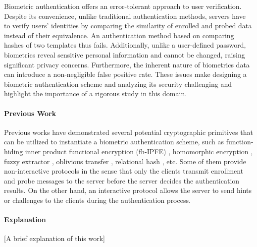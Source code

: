 


Biometric authentication offers an error-tolerant approach to user verification. Despite its convenience, unlike traditional authentication methods, servers have to verify users' identities by comparing the similarity of enrolled and probed data instead of their equivalence. An authentication method based on comparing hashes of two templates thus fails. Additionally, unlike a user-defined password, biometrics reveal sensitive personal information and cannot be changed, raising significant privacy concerns. Furthermore, the inherent nature of biometrics data can introduce a non-negligible false positive rate. These issues make designing a biometric authentication scheme and analyzing its security challenging and highlight the importance of a rigorous study in this domain.

\paragraph{Previous Work}
Previous works have demonstrated several potential cryptographic primitives that can be utilized to instantiate a biometric authentication scheme, such as function-hiding inner product functional encryption (fh-IPFE) \cite{cryptoeprint:2016/440, cryptoeprint:2018/1214, 10.1007/978-3-030-90567-5_33, 10.1145/3488932.3497754, cryptoeprint:2023/481}, homomorphic encryption \cite{10.1007/978-3-642-40588-4_5, pradel2021privacypreservingbiometricmatchingusing}, fuzzy extractor \cite{10.1145/1030083.1030096, 7980010}, oblivious transfer \cite{cryptoeprint:2012/586}, relational hash \cite{cryptoeprint:2014/394}, etc. Some of them provide non-interactive protocols in the sense that only the clients transmit enrollment and probe messages to the server before the server decides the authentication results. On the other hand, an interactive protocol allows the server to send hints or challenges to the clients during the authentication process.

\paragraph{Explanation}

[A brief explanation of this work]


